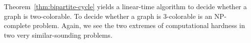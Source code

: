 Theorem~\ref{thm:bipartite-cycle} yields a linear-time algorithm to decide whether a graph is two-colorable. 
To decide whether a graph is \(3\)-colorable is an NP-complete problem. 
Again, we see the two extremes of computational hardness in two very similar-sounding problems.











